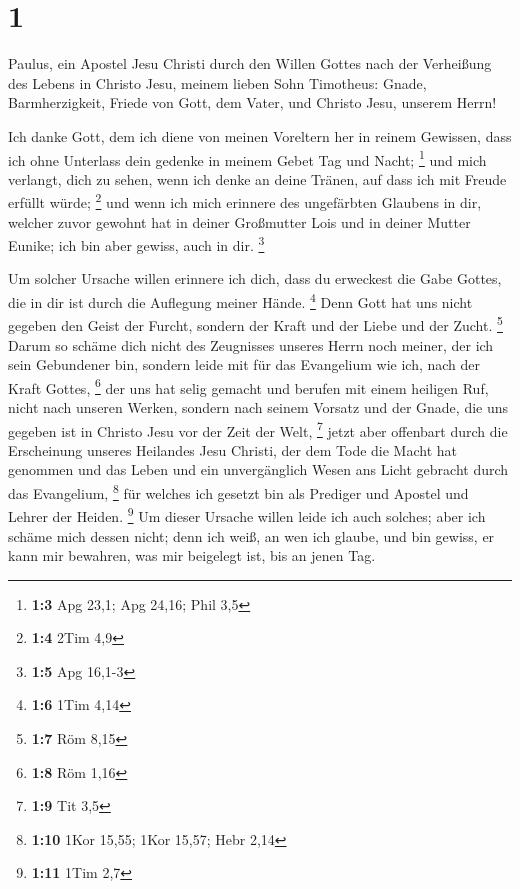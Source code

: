 \hypertarget{section}{%
\section{1}\label{section}}

 Paulus, ein Apostel Jesu Christi durch den Willen Gottes
nach der Verheißung des Lebens in Christo Jesu,  meinem
lieben Sohn Timotheus: Gnade, Barmherzigkeit, Friede von Gott, dem
Vater, und Christo Jesu, unserem Herrn!

 Ich danke Gott, dem ich diene von meinen Voreltern her in
reinem Gewissen, dass ich ohne Unterlass dein gedenke in meinem Gebet
Tag und Nacht; \footnote{\textbf{1:3} Apg 23,1; Apg 24,16; Phil 3,5}
 und mich verlangt, dich zu sehen, wenn ich denke an deine
Tränen, auf dass ich mit Freude erfüllt würde; \footnote{\textbf{1:4}
  2Tim 4,9}  und wenn ich mich erinnere des ungefärbten
Glaubens in dir, welcher zuvor gewohnt hat in deiner Großmutter Lois und
in deiner Mutter Eunike; ich bin aber gewiss, auch in dir. \footnote{\textbf{1:5}
  Apg 16,1-3}

 Um solcher Ursache willen erinnere ich dich, dass du
erweckest die Gabe Gottes, die in dir ist durch die Auflegung meiner
Hände. \footnote{\textbf{1:6} 1Tim 4,14}  Denn Gott hat
uns nicht gegeben den Geist der Furcht, sondern der Kraft und der Liebe
und der Zucht. \footnote{\textbf{1:7} Röm 8,15}  Darum so
schäme dich nicht des Zeugnisses unseres Herrn noch meiner, der ich sein
Gebundener bin, sondern leide mit für das Evangelium wie ich, nach der
Kraft Gottes, \footnote{\textbf{1:8} Röm 1,16}  der uns
hat selig gemacht und berufen mit einem heiligen Ruf, nicht nach unseren
Werken, sondern nach seinem Vorsatz und der Gnade, die uns gegeben ist
in Christo Jesu vor der Zeit der Welt, \footnote{\textbf{1:9} Tit 3,5}
 jetzt aber offenbart durch die Erscheinung unseres
Heilandes Jesu Christi, der dem Tode die Macht hat genommen und das
Leben und ein unvergänglich Wesen ans Licht gebracht durch das
Evangelium, \footnote{\textbf{1:10} 1Kor 15,55; 1Kor 15,57; Hebr 2,14}
 für welches ich gesetzt bin als Prediger und Apostel und
Lehrer der Heiden. \footnote{\textbf{1:11} 1Tim 2,7}  Um
dieser Ursache willen leide ich auch solches; aber ich schäme mich
dessen nicht; denn ich weiß, an wen ich glaube, und bin gewiss, er kann
mir bewahren, was mir beigelegt ist, bis an jenen Tag.

